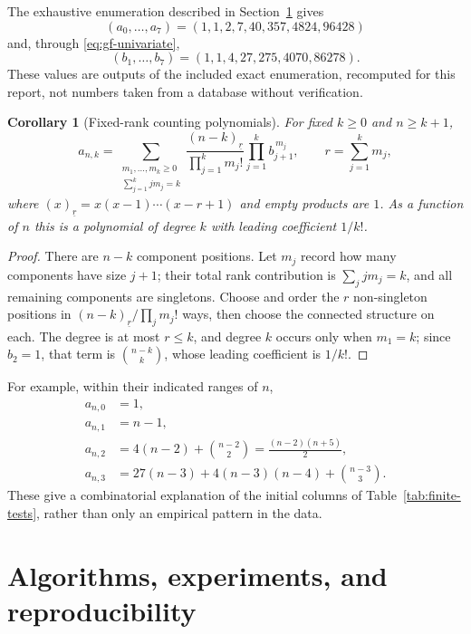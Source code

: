\documentclass[11pt,letterpaper]{article}
\newtheorem{corollary}[theorem]{Corollary}
\theoremstyle{definition}
\theoremstyle{remark}
\begin{document}
The exhaustive enumeration described in Section~\ref{sec:computation} gives
\[
 (a_0,\ldots,a_7)=(1,1,2,7,40,357,4824,96428)
\]
and, through \eqref{eq:gf-univariate},
\[
 (b_1,\ldots,b_7)=(1,1,4,27,275,4070,86278).
\]
These values are outputs of the included exact enumeration, recomputed for
this report, not numbers taken from a database without verification.

\begin{corollary}[Fixed-rank counting polynomials]\label{cor:polynomial}
For fixed $k\ge0$ and $n\ge k+1$,
\begin{equation}\label{eq:fixed-rank}
 a_{n,k}=
 \sum_{\substack{m_1,\ldots,m_k\ge0\\ \sum_{j=1}^kjm_j=k}}
 \frac{(n-k)_{\underline r}}{\prod_{j=1}^km_j!}
 \prod_{j=1}^kb_{j+1}^{\,m_j},
 \qquad r=\sum_{j=1}^km_j,
\end{equation}
where $(x)_{\underline r}=x(x-1)\cdots(x-r+1)$ and empty products are $1$.
As a function of $n$ this is a polynomial of degree $k$ with leading
coefficient $1/k!$.
\end{corollary}
\begin{proof}
There are $n-k$ component positions. Let $m_j$ record how many components
have size $j+1$; their total rank contribution is $\sum_jjm_j=k$, and all
remaining components are singletons. Choose and order the $r$ non-singleton
positions in $(n-k)_{\underline r}/\prod_jm_j!$ ways, then choose the
connected structure on each. The degree is at most $r\le k$, and degree $k$
occurs only when $m_1=k$; since $b_2=1$, that term is $\binom{n-k}{k}$,
whose leading coefficient is $1/k!$.
\end{proof}

For example, within their indicated ranges of $n$,
\begin{align*}
 a_{n,0}&=1,\\
 a_{n,1}&=n-1,\\
 a_{n,2}&=4(n-2)+\binom{n-2}{2}=\frac{(n-2)(n+5)}{2},\\
 a_{n,3}&=27(n-3)+4(n-3)(n-4)+\binom{n-3}{3}.
\end{align*}
These give a combinatorial explanation of the initial columns of
Table~\ref{tab:finite-tests}, rather than only an empirical pattern in the
data.

\section{Algorithms, experiments, and reproducibility}\label{sec:computation}
\end{document}
